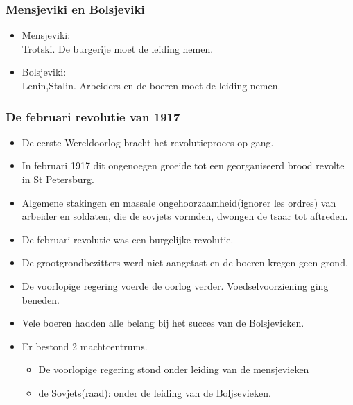\documentclass{article}
\begin{document}
\subsubsection{Mensjeviki en Bolsjeviki}
\begin{itemize}
    \item Mensjeviki:\\
    Trotski. De burgerije moet de leiding nemen.
    \item Bolsjeviki:\\
    Lenin,Stalin. Arbeiders en de boeren moet de leiding nemen.
\end{itemize}
\subsubsection{De februari revolutie van 1917}
\begin{itemize}
    \item De eerste Wereldoorlog bracht het revolutieproces op gang.
    \item In februari 1917 dit ongenoegen groeide tot een georganiseerd brood revolte in St Petersburg.
    \item Algemene stakingen en massale ongehoorzaamheid(ignorer les ordres) van arbeider en soldaten, die de sovjets vormden, dwongen de tsaar tot aftreden.
    \item De februari revolutie was een burgelijke revolutie.
    \item De grootgrondbezitters werd niet aangetast en de boeren kregen geen grond.
    \item De voorlopige regering voerde de oorlog verder. Voedselvoorziening ging beneden.
    \item Vele boeren hadden alle belang bij het succes van de Bolsjevieken.
    \item Er bestond 2 machtcentrums.
    \begin{itemize}
        \item De voorlopige regering stond onder leiding van de mensjevieken
        \item de Sovjets(raad): onder de leiding van de Boljsevieken.
    \end{itemize}
\end{itemize}
\end{document}
